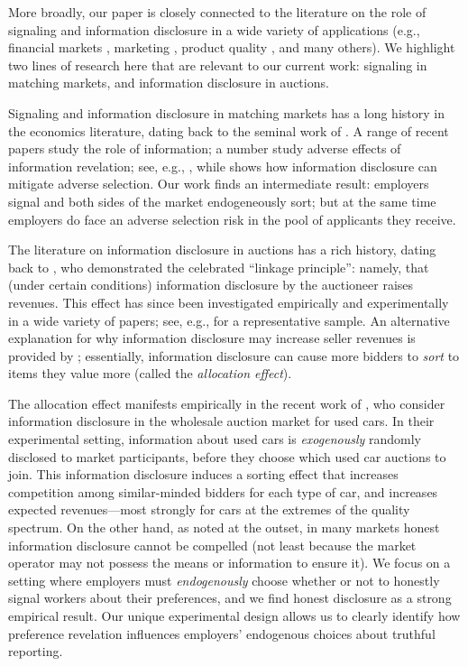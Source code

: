 \documentclass[prodmode,acmec]{ec-acmsmall}
\begin{document}
More broadly, our paper is closely connected to the literature on the role of signaling and information disclosure in a wide variety of applications
(e.g., financial markets \cite{gilson1984, Diamond1991, Healy2001}, marketing \cite{Day1976}, product quality \cite{Jin2003}, and many others).
We highlight two lines of research here that are relevant to our current work: signaling in matching markets, and information disclosure in auctions.

Signaling and information disclosure in matching markets has a long history in the economics literature, dating back to the seminal work of \cite{spence1973job}.
A range of recent papers study the role of information; a number study adverse effects of information revelation; see, e.g., \cite{ely2009hiring, ely2013adverse, kushnir2013harmful}, while \cite{Lewis2011} shows how information disclosure can mitigate adverse selection.
Our work finds an intermediate result: employers signal and both sides of the market endogeneously sort; but at the same time employers do face an adverse selection risk in the pool of applicants they receive.

The literature on information disclosure in auctions has a rich history, dating back to \cite{Milgrom1982}, who demonstrated the celebrated ``linkage principle'':
namely, that (under certain conditions) information disclosure by the auctioneer raises revenues.
This effect has since been investigated empirically and experimentally in a wide variety of papers;
see, e.g., \cite{porter1995, levin1996, Silva2008, Cho2014} for a representative sample.
An alternative explanation for why information disclosure may increase seller revenues is provided by \cite{board2009};
essentially, information disclosure can cause more bidders to {\em sort} to items they value more (called the {\em allocation effect}).  

The allocation effect manifests empirically in the recent work of \cite{tadelis2011information}, who consider information disclosure in the wholesale auction market for used cars.
In their experimental setting, information about used cars is {\em exogenously} randomly disclosed to market participants, before they choose which used car auctions to join.
This information disclosure induces a sorting effect that increases competition among similar-minded bidders for each type of car, and increases expected revenues---most strongly for cars at the extremes of the quality spectrum.
On the other hand, as noted at the outset, in many markets honest information disclosure cannot be compelled (not least because the market operator may not possess the means or information to ensure it).
We focus on a setting where employers must {\em endogenously} choose whether or not to honestly signal workers about their preferences, and we find honest disclosure as a strong empirical result.
Our unique experimental design allows us to clearly identify how preference revelation influences employers' endogenous choices about truthful reporting.
\end{document}
